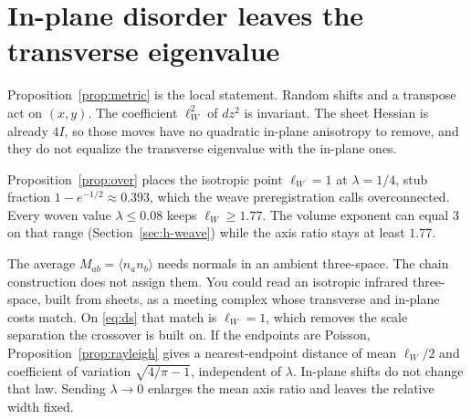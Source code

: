 \section{In-plane disorder leaves the transverse eigenvalue}
\label{sec:h-iso}

Proposition~\ref{prop:metric} is the local statement.
Random shifts and a transpose act on \((x,y)\).
The coefficient \(\ell_W^2\) of \(dz^2\) is invariant.
The sheet Hessian is already \(4I\), so those moves have no quadratic
in-plane anisotropy to remove, and they do not equalize the transverse
eigenvalue with the in-plane ones.

Proposition~\ref{prop:over} places the isotropic point \(\ell_W=1\) at
\(\lambda=1/4\), stub fraction \(1-e^{-1/2}\approx 0.393\), which the weave
preregistration calls overconnected.
Every woven value \(\lambda\le 0.08\) keeps \(\ell_W\ge 1.77\).
The volume exponent can equal \(3\) on that range
(Section~\ref{sec:h-weave}) while the axis ratio stays at least \(1.77\).

The average \(M_{ab}=\langle n_a n_b\rangle\) needs normals in an ambient
three-space.
The chain construction does not assign them.
You could read an isotropic infrared three-space, built from sheets, as a
meeting complex whose transverse and in-plane costs match.
On \eqref{eq:ds} that match is \(\ell_W=1\), which removes the scale
separation the crossover is built on.
If the endpoints are Poisson, Proposition~\ref{prop:rayleigh} gives a
nearest-endpoint distance of mean \(\ell_W/2\) and coefficient of
variation \(\sqrt{4/\pi-1}\), independent of \(\lambda\).
In-plane shifts do not change that law.
Sending \(\lambda\to 0\) enlarges the mean axis ratio and leaves the
relative width fixed.
